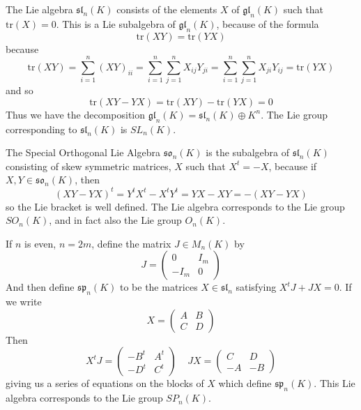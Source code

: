 \begin{example}
    The Lie algebra $\mathfrak{sl}_n(K)$ consists of the elements $X$ of $\mathfrak{gl}_n(K)$ such that $\text{tr}(X) = 0$. This is a Lie subalgebra of $\mathfrak{gl}_n(K)$, because of the formula
    \[ \text{tr}(XY) = \text{tr}(YX) \]
    because
    \[ \text{tr}(XY) = \sum_{i = 1}^n (XY)_{ii} = \sum_{i = 1}^n \sum_{j = 1}^n X_{ij} Y_{ji} = \sum_{i = 1}^n \sum_{j = 1}^n X_{ji} Y_{ij} = \text{tr}(YX) \]
    and so
    \[ \text{tr}(XY - YX) = \text{tr}(XY) - \text{tr}(YX) = 0 \]
    Thus we have the decomposition $\mathfrak{gl}_n(K) = \mathfrak{sl}_n(K) \oplus K^n$. The Lie group corresponding to $\mathfrak{sl}_n(K)$ is $SL_n(K)$.
\end{example}

\begin{example}
    The Special Orthogonal Lie Algebra $\mathfrak{so}_n(K)$ is the subalgebra of $\mathfrak{sl}_n(K)$ consisting of skew symmetric matrices, $X$ such that $X^t = -X$, because if $X,Y \in \mathfrak{so}_n(K)$, then
    \[ (XY - YX)^t = Y^tX^t - X^tY^t = YX - XY = -(XY - YX) \]
    so the Lie bracket is well defined. The Lie algebra corresponds to the Lie group $SO_n(K)$, and in fact also the Lie group $O_n(K)$.
\end{example}

\begin{example}
    If $n$ is even, $n = 2m$, define the matrix $J \in M_n(K)$ by
    \[ J = \begin{pmatrix} 0 & I_m \\ -I_m & 0 \end{pmatrix} \]
    And then define $\mathfrak{sp}_n(K)$ to be the matrices $X \in \mathfrak{sl}_n$ satisfying $X^tJ + JX = 0$. If we write
    \[ X = \begin{pmatrix} A & B \\ C & D \end{pmatrix} \]
    Then
    \[ X^tJ = \begin{pmatrix} -B^t & A^t \\ -D^t & C^t \end{pmatrix}\ \ \ \ \ JX = \begin{pmatrix} C & D \\ -A & -B \end{pmatrix} \]
    giving us a series of equations on the blocks of $X$ which define $\mathfrak{sp}_n(K)$. This Lie algebra corresponds to the Lie group $SP_n(K)$.
\end{example}

